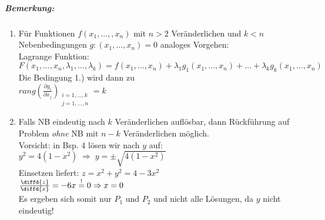 \subparagraph{Bemerkung:} 
\begin{enumerate}
\item Für Funktionen $f(x_1,\dots, ,x_n)$ mit $n>2$ Veränderlichen und $k<n$ Nebenbedingungen $g:(x_1, \dots, x_n)=0$ analoges Vorgehen:\\
Lagrange Funktion:\\
$F(x_1,\dots, x_n, \lambda_1, \dots, \lambda_k)=f(x_1,\dots, x_n)+\lambda_1g_1(x_1,\dots,x_n)+\dots+\lambda_kg_k(x_1,\dots,x_n)$\\
Die Bedingung 1.) wird dann zu \\
$rang\left(\frac{\partial g_i}{\partial x_j}\right)_{\substack{i=1,\dots,k\\j=1,\dots,n}}=k$
\item Falls NB eindeutig nach $k$ Veränderlichen auflösbar, dann Rückführung auf Problem \emph{ohne} NB mit $n-k$ Veränderlichen möglich.\\
Vorsicht: in Bsp. 4 lösen wir nach $y$ auf: $y^2=4(1-x^2) \; \Rightarrow \; y=\pm\sqrt{4(1-x^2)}$\\
Einsetzen liefert: $z=x^2+y^2=4-3x^2$\\
$\frac{\diffd{z}}{\diffd{x}}=-6x \overset{!}{=} 0 \Rightarrow x=0$\\
Es ergeben sich somit nur $P_1$ und $P_2$ und nicht alle Lösungen, da $y$ nicht eindeutig!
\end{enumerate}